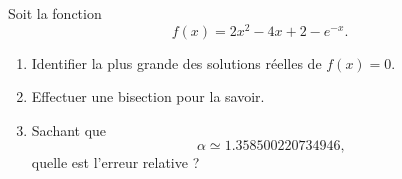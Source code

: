 
\begin{exercice}\label{exomazhe-0004}

    Soit la fonction 
    \begin{equation}
        f(x)=2x^2-4x+2-e^{-x}.
    \end{equation}

    \begin{enumerate}
        \item
            Identifier la plus grande des solutions réelles de \( f(x)=0\).
        \item
            Effectuer une bisection pour la savoir.
        \item
            Sachant que
            \begin{equation}
                \alpha\simeq 1.358500220734946,
            \end{equation}
            quelle est l'erreur relative ?
    \end{enumerate}

\end{exercice}
